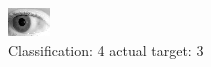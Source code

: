 \begin{figure}[h!]
\begin{center}
\includegraphics[width=0.60\columnwidth]{figures/ID313_class_4_target_3.png}
\end{center}
\caption{ Classification: 4 actual target: 3}
\label{fig:ID313_class_4_target_3}
\end{figure}
